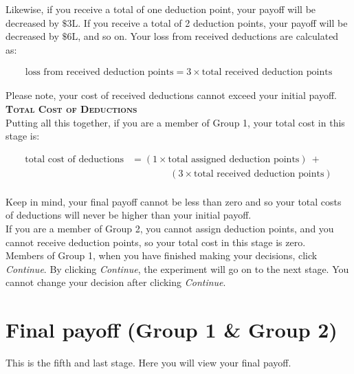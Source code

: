 \documentclass[12pt]{article}
\begin{document}
Likewise, if you receive a total of one deduction point, your payoff will be decreased by $\$3\text{L}$. If you receive a total of 2 deduction points, your payoff will be decreased by $\$6\text{L}$, and so on. Your loss from received deductions are calculated as:

\begin{align*}
\text{loss from received deduction points} = 3 \times \text{total received deduction points}
\end{align*} 

Please note, your cost of received deductions cannot exceed your initial payoff.\\

{\bf \scshape Total Cost of Deductions}\\

Putting all this together, if you are a member of Group 1, your total cost in this stage is:

\begin{align*}
\text{total cost of deductions} &= (1 \times \text{total assigned deduction points}) ~ + \\
& \qquad \qquad (3 \times \text{total received deduction points})\\
\end{align*}

Keep in mind, your final payoff cannot be less than zero and so your total costs of deductions will never be higher than your initial payoff.\\

If you are a member of Group 2, you cannot assign deduction points, and you cannot receive deduction points, so your total cost in this stage is zero.\\

Members of Group 1, when you have finished making your decisions, click {\em Continue}.  By clicking {\em Continue}, the experiment will go on to the next stage.  You cannot change your decision after clicking {\em Continue}.

\newpage

\section{Final payoff (Group 1 \& Group 2)}

This is the fifth and last stage.  Here you will view your final payoff.\\
\end{document}
